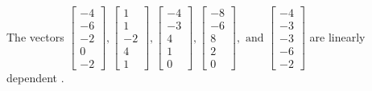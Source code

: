 \begin{exercise}
\begin{exerciseStatement}
  \end{exerciseStatement}
  \begin{exerciseAnswer}
   The vectors \(\left[\begin{array}{r}
-4 \\
-6 \\
-2 \\
0 \\
-2
\end{array}\right] , \left[\begin{array}{r}
1 \\
1 \\
-2 \\
4 \\
1
\end{array}\right] , \left[\begin{array}{r}
-4 \\
-3 \\
4 \\
1 \\
0
\end{array}\right] , \left[\begin{array}{r}
-8 \\
-6 \\
8 \\
2 \\
0
\end{array}\right] , \text{ and } \left[\begin{array}{r}
-4 \\
-3 \\
-3 \\
-6 \\
-2
\end{array}\right]\) are 
  	 linearly dependent  .
  


  \end{exerciseAnswer}
\end{exercise}